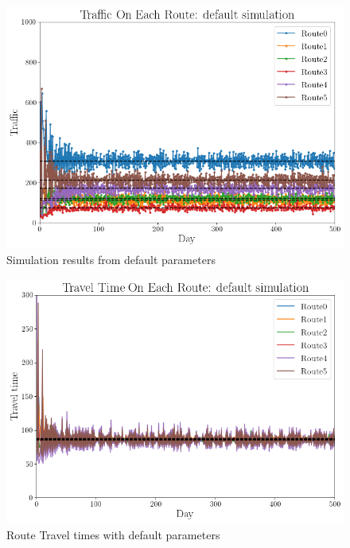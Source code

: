 \documentclass[12pt, a4paper, onecolumn]{article}
\begin{document}
\begin{figure}[h!]
	\centering
	\includegraphics[scale=.5]{default.png}
	\caption{Simulation results from default parameters}
	\label{fig:defaults}
	\end{figure}

\begin{figure}[h!]
	\centering
	\includegraphics[scale=.5]{default_tts.png}
	\caption{Route Travel times with default parameters}
	\label{fig:defaults_tts}
	\end{figure}
\end{document}
